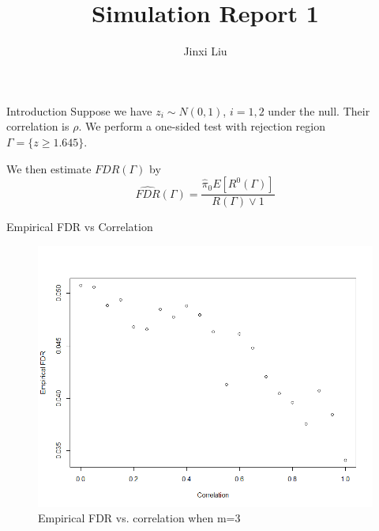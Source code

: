 \documentclass{beamer}
\title{Simulation Report 1}
\author{Jinxi Liu}
\begin{document}
	
\begin{frame}
	
	\titlepage
	
\end{frame}


\begin{frame}[t]{Introduction}\vspace{10pt}
Suppose we have $z_i \sim N(0,1)$, $i=1,2$ under the null. Their correlation is $\rho$. We perform a one-sided test with rejection region $\Gamma = \{z \geq 1.645\}.$

We then estimate $FDR(\Gamma)$ by 
\begin{equation}\label{eq1}
 \hat{FDR}(\Gamma) = \frac{\hat{\pi}_0 E[R^0(\Gamma)]}{ R(\Gamma)\vee 1}
\end{equation}

\end{frame}

\begin{frame}[t]{Empirical FDR vs Correlation}\vspace{10pt}

\begin{figure}[h]
	\centering
	\includegraphics[scale=0.35]{fdrmeanVSrho_m=3}
	\caption{\footnotesize{Empirical FDR vs. correlation when m=3}}
	\label{fig1}
\end{figure}

\end{frame}
\end{document}
